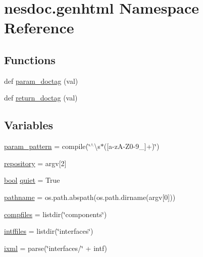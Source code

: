 \hypertarget{namespacenesdoc_1_1genhtml}{}\section{nesdoc.\+genhtml Namespace Reference}
\label{namespacenesdoc_1_1genhtml}
\subsection*{Functions}
\begin{DoxyCompactItemize}
\item 
def \hyperlink{namespacenesdoc_1_1genhtml_a0135de8b69c3bfe717d89ca0149a1c4c}{param\+\_\+doctag} (val)
\item 
def \hyperlink{namespacenesdoc_1_1genhtml_ae8ff20693f4ba7b600cb51b8228ee6b9}{return\+\_\+doctag} (val)
\end{DoxyCompactItemize}
\subsection*{Variables}
\begin{DoxyCompactItemize}
\item 
\hyperlink{namespacenesdoc_1_1genhtml_a4638dba17d829583af3cb06893893ec3}{param\+\_\+pattern} = compile(\char`\"{}$^\wedge$\textbackslash{}s$\ast$(\mbox{[}a-\/zA-\/Z0-\/9\+\_\+\mbox{]}+)\char`\"{})
\item 
\hyperlink{namespacenesdoc_1_1genhtml_ac786cf6372662e1e1d4a412db5e29a05}{repository} = argv\mbox{[}2\mbox{]}
\item 
\hyperlink{_p_e___types_8h_a97a80ca1602ebf2303258971a2c938e2}{bool} \hyperlink{namespacenesdoc_1_1genhtml_a00f7bb8cfab54c7b66671b161586e291}{quiet} = True
\item 
\hyperlink{namespacenesdoc_1_1genhtml_a1c2d61a98dce76b296cfa2b6c9ceb32e}{pathname} = os.\+path.\+abspath(os.\+path.\+dirname(argv\mbox{[}0\mbox{]}))
\item 
\hyperlink{namespacenesdoc_1_1genhtml_aa73798f6cf52b14f16d7323825dd425d}{compfiles} = listdir(\char`\"{}components\char`\"{})
\item 
\hyperlink{namespacenesdoc_1_1genhtml_a23b54662088644f83fd0e0b716512acc}{intffiles} = listdir(\char`\"{}interfaces\char`\"{})
\item 
\hyperlink{namespacenesdoc_1_1genhtml_a38b1cb117ee92811743c3a46427503d0}{ixml} = parse(\char`\"{}interfaces/\char`\"{} + intf)
\end{DoxyCompactItemize}


